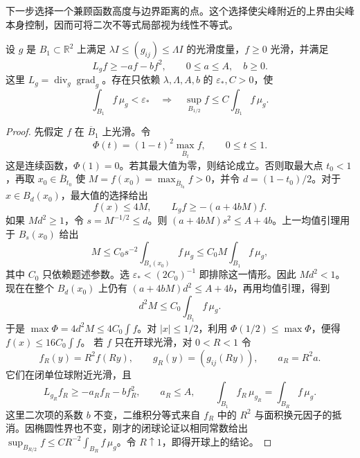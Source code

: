 下一步选择一个兼顾函数高度与边界距离的点。这个选择使尖峰附近的上界由尖峰本身控制，因而可将二次不等式局部视为线性不等式。

\begin{lemma}\label{g3:lem:heinz-small-integral}
	设 \(g\) 是 \(B_1\subset\mathbb R^2\) 上满足 \(\lambda I\le(g_{ij})\le\Lambda I\) 的光滑度量，\(f\ge0\) 光滑，并满足
	\[
		L_gf\ge-af-bf^2,\qquad 0\le a\le A,\quad b\ge0.
	\]
	这里 \(L_g=\operatorname{div}_g\operatorname{grad}_g\)。存在只依赖 \(\lambda,\Lambda,A,b\) 的 \(\varepsilon_*,C>0\)，使
	\[
		\int_{B_1}f\,\mu_g<\varepsilon_*
		\quad\Longrightarrow\quad
		\sup_{B_{1/2}}f\le C\int_{B_1}f\,\mu_g.
	\]
\end{lemma}
\begin{proof}
	先假定 \(f\) 在 \(\overline B_1\) 上光滑。令
	\[
		\Phi(t)=(1-t)^2\max_{\overline B_t}f,\qquad0\le t\le1.
	\]
	这是连续函数，\(\Phi(1)=0\)。若其最大值为零，则结论成立。否则取最大点 \(t_0<1\)，再取 \(x_0\in\overline B_{t_0}\) 使 \(M=f(x_0)=\max_{\overline B_{t_0}}f>0\)，并令 \(d=(1-t_0)/2\)。对于 \(x\in B_d(x_0)\)，最大值的选择给出
	\[
		f(x)\le4M,
		\qquad L_gf\ge-(a+4bM)f.
	\]
	如果 \(Md^2\ge1\)，令 \(s=M^{-1/2}\le d\)。则
	\((a+4bM)s^2\le A+4b\)。上一均值引理用于 \(B_s(x_0)\) 给出
	\[
		M\le C_0s^{-2}\int_{B_s(x_0)}f\,\mu_g
		\le C_0M\int_{B_1}f\,\mu_g,
	\]
	其中 \(C_0\) 只依赖题述参数。选 \(\varepsilon_*<(2C_0)^{-1}\) 即排除这一情形。因此 \(Md^2<1\)。现在在整个 \(B_d(x_0)\) 上仍有 \((a+4bM)d^2\le A+4b\)，再用均值引理，得到
	\[
		d^2M\le C_0\int_{B_1}f\,\mu_g.
	\]
	于是 \(\max\Phi=4d^2M\le4C_0\int f\)。对 \(|x|\le1/2\)，利用 \(\Phi(1/2)\le\max\Phi\)，便得 \(f(x)\le16C_0\int f\)。
	若 \(f\) 只在开球光滑，对 \(0<R<1\) 令
	\[
		f_R(y)=R^2f(Ry),\qquad g_R(y)=(g_{ij}(Ry)),\qquad a_R=R^2a.
	\]
	它们在闭单位球附近光滑，且
	\[
		L_{g_R}f_R\ge-a_Rf_R-bf_R^2,\qquad a_R\le A,
		\qquad
		\int_{B_1}f_R\,\mu_{g_R}=\int_{B_R}f\,\mu_g.
	\]
	这里二次项的系数 \(b\) 不变，二维积分等式来自 \(f_R\) 中的 \(R^2\) 与面积换元因子的抵消。因椭圆性界也不变，刚才的闭球论证以相同常数给出
	\(\sup_{B_{R/2}}f\le CR^{-2}\int_{B_R}f\,\mu_g\)。令 \(R\uparrow1\)，即得开球上的结论。
\end{proof}

